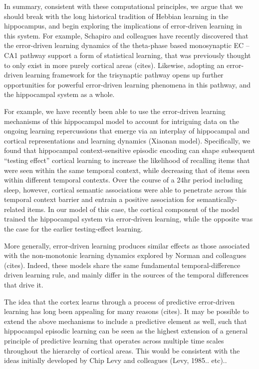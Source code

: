 \documentclass[11pt,twoside]{article}
\newif\myifpdf
\begin{document}
In summary, consistent with these computational principles, we argue that we should break with the long historical tradition of Hebbian learning in the hippocampus, and begin exploring the implications of error-driven learning in this system.  For example, Schapiro and colleagues have recently discovered that the error-driven learning dynamics of the theta-phase based monosynaptic EC -- CA1 pathway support a form of statistical learning, that was previously thought to only exist in more purely cortical areas (cites).  Likewise, adopting an error-driven learning framework for the trisynaptic pathway opens up further opportunities for powerful error-driven learning phenomena in this pathway, and the hippocampal system as a whole.

For example, we have recently been able to use the error-driven learning mechanisms of this hippocampal model to account for intriguing data on the ongoing learning repercussions that emerge via an interplay of hippocampal and cortical representations and learning dynamics (Xiaonan model).  Specifically, we found that hippocampal context-sensitive episodic encoding can shape subsequent “testing effect” cortical learning to increase the likelihood of recalling items that were seen within the same temporal context, while decreasing that of items seen within different temporal contexts.  Over the course of a 24hr period including sleep, however, cortical semantic associations were able to penetrate across this temporal context barrier and entrain a positive association for semantically-related items.  In our model of this case, the cortical component of the model trained the hippocampal system via error-driven learning, while the opposite was the case for the earlier testing-effect learning.

More generally, error-driven learning produces similar effects as those associated with the non-monotonic learning dynamics explored by Norman and colleagues (cites).  Indeed, these models share the same fundamental temporal-difference driven learning rule, and mainly differ in the sources of the temporal differences that drive it.

The idea that the cortex learns through a process of predictive error-driven learning has long been appealing for many reasons (cites).  It may be possible to extend the above mechanisms to include a predictive element as well, such that hippocampal episodic learning can be seen as the highest extension of a general principle of predictive learning that operates across multiple time scales throughout the hierarchy of cortical areas.  This would be consistent with the ideas initially developed by Chip Levy and colleagues (Levy, 1985.. etc)..
\end{document}
